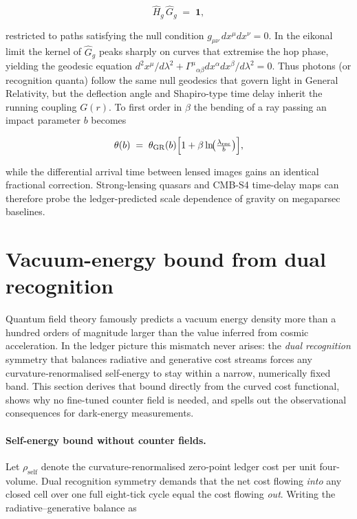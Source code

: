 \documentclass[11pt,oneside]{book}
\begin{document}
{\[
   \hat H_{g}\,\hat G_{g}\;=\;\mathbf 1,
\]

restricted to paths satisfying the null condition
\(g_{\mu\nu}\,dx^{\mu}dx^{\nu}=0\).  In the eikonal limit the kernel of
\(\hat G_{g}\) peaks sharply on curves that extremise the hop phase,
yielding the geodesic equation
\(d^{2}x^{\mu}/d\lambda^{2}
  +\Gamma^{\mu}{}_{\alpha\beta}
   dx^{\alpha}dx^{\beta}/d\lambda^{2}=0\).
Thus photons (or recognition quanta) follow the same null geodesics that
govern light in General Relativity, but the deflection angle and
Shapiro-type time delay inherit the running coupling \(G(r)\).  To first
order in \(\beta\) the bending of a ray passing an impact parameter
\(b\) becomes

\[
   \theta(b)
   \;=\;
   \theta_{\mathrm{GR}}(b)
   \Bigl[1+\beta\ln
     \!\bigl(\tfrac{\lambda_{\text{rec}}}{b}\bigr)\Bigr],
\]

while the differential arrival time between lensed images gains an
identical fractional correction.  Strong-lensing quasars and CMB-S4
time-delay maps can therefore probe the ledger-predicted scale
dependence of gravity on megaparsec baselines.

\section{Vacuum-energy bound from dual recognition}

Quantum field theory famously predicts a vacuum energy density more than
a hundred orders of magnitude larger than the value inferred from cosmic
acceleration.  In the ledger picture this mismatch never arises: the
\emph{dual recognition} symmetry that balances radiative and generative
cost streams forces any curvature‐renormalised self-energy to stay
within a narrow, numerically fixed band.  This section derives that
bound directly from the curved cost functional, shows why no
fine-tuned counter field is needed, and spells out the observational
consequences for dark-energy measurements.
\paragraph{Self-energy bound without counter fields.}
Let $\rho_{\text{self}}$ denote the curvature-renormalised zero-point
ledger cost per unit four-volume.  Dual recognition symmetry demands
that the net cost flowing \emph{into} any closed cell over one full
eight-tick cycle equal the cost flowing \emph{out}.  Writing the
radiative–generative balance as

}
\end{document}
